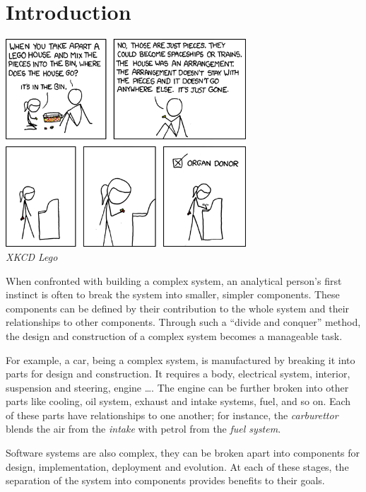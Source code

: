 \chapter{Introduction}
\label{introduction}



\begin{center}
  \includegraphics[width=9cm]{introductionpics/lego}\\
  \textit{XKCD Lego}
\end{center}

When confronted with building a complex system, an analytical person's first instinct is often to break the system into smaller, simpler components. 
These components can be defined by their contribution to the whole system and their relationships to other components.
Through such a ``divide and conquer'' method, the design and construction of a complex system becomes a manageable task.

For example, a car, being a complex system, is manufactured by breaking it into parts for design and construction.
It requires a body, electrical system, interior, suspension and steering, engine \ldots. 
The engine can be further broken into other parts like cooling, oil system, exhaust and intake systems, fuel, and so on.
Each of these parts have relationships to one another; for instance, the \textit{carburettor} blends the air from the \textit{intake} with petrol from the \textit{fuel system}.

Software systems are also complex, they can be broken apart into components for design, implementation, deployment and evolution.
At each of these stages, the separation of the system into components provides benefits to their goals.

